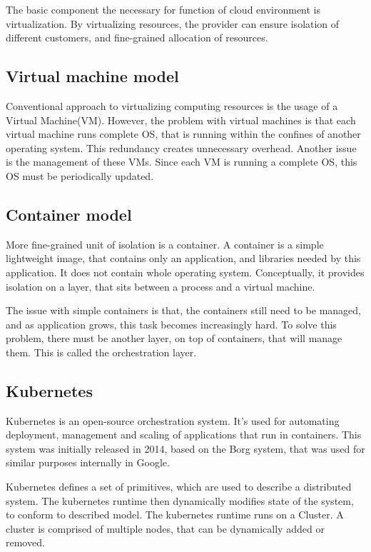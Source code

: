 The basic component the necessary for function of cloud environment is virtualization. By virtualizing resources,
the provider can ensure isolation of different customers, and fine-grained allocation of resources.

\subsection{Virtual machine model}
Conventional approach to virtualizing computing resources is the usage of a Virtual Machine(VM).
However, the problem with virtual machines is that each virtual machine runs complete OS, that is
running within the confines of another operating system. This redundancy creates unnecessary overhead.
Another issue is the management of these VMs. Since each VM is running a complete OS,
this OS must be periodically updated.

\subsection{Container model}
More fine-grained unit of isolation is a container. A container is a simple lightweight image, that contains
only an application, and libraries needed by this application. It does not contain whole operating system.
Conceptually, it provides isolation on a layer, that sits between a process and a virtual machine.

The issue with simple containers is that, the containers still need to be managed, and as application
grows, this task becomes increasingly hard. To solve this problem, there must be another layer, on top of containers,
that will manage them. This is called the orchestration layer.

\subsection{Kubernetes}

Kubernetes\cite{web:k8s} is an open-source orchestration system. It's used for automating
deployment, management and scaling of applications that run in containers. This system was initially released in 2014,
based on the Borg\cite{borg} system, that was used for similar purposes internally in Google.

Kubernetes defines a set of primitives, which are used to describe a distributed system. The kubernetes
runtime then dynamically modifies state of the system, to conform to described model. The kubernetes runtime
runs on a Cluster. A cluster is comprised of multiple nodes, that can be dynamically added or removed.

